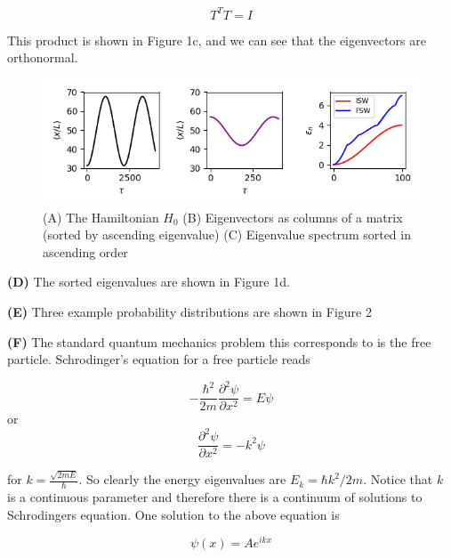 \documentclass[12pt]{article}
\theoremstyle{definition}
\begin{document}
{\begin{equation*}
T^{T}T = I
\end{equation*}

This product is shown in Figure 1c, and we can see that the eigenvectors are orthonormal.

\begin{figure}[t!]
\centering
\includegraphics[width=15cm]{Figure_1}
\caption{(A) The Hamiltonian $H_{0}$ (B) Eigenvectors as columns of a matrix (sorted by ascending eigenvalue) (C) Eigenvalue spectrum sorted in ascending order}
\label{fig:method}
\end{figure}

\vspace{0.1in}
\noindent \textbf{(D)} The sorted eigenvalues are shown in Figure 1d.

\vspace{0.1in}
\noindent \textbf{(E)} Three example probability distributions are shown in Figure 2



\vspace{0.1in}
\noindent \textbf{(F)} The standard quantum mechanics problem this corresponds to is the free particle. Schrodinger's equation for a free particle reads

\begin{equation*}
-\frac{\hbar^{2}}{2m}\frac{\partial^{2}\psi}{\partial x^{2}} = E\psi
\end{equation*}
or
\begin{equation*}
\frac{\partial^{2}\psi}{\partial x^{2}} = -k^{2}\psi
\end{equation*}

for $k = \frac{\sqrt{2mE}}{\hbar}$. So clearly the energy eigenvalues are $E_{k} = \hbar k^{2}/2m$. Notice that $k$ is a continuous parameter and therefore there is a continuum of solutions to Schrodingers equation. One solution to the above equation is

\begin{equation*}
\psi(x) = Ae^{ikx}
\end{equation*}

}
\end{document}
